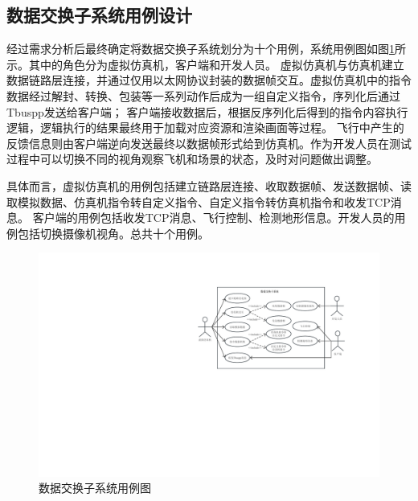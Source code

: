 \subsection{数据交换子系统用例设计}{
经过需求分析后最终确定将数据交换子系统划分为十个用例，系统用例图如图\ref{usecase}所示。其中的角色分为虚拟仿真机，客户端和开发人员。
虚拟仿真机与仿真机建立数据链路层连接，并通过仅用以太网协议封装的数据帧交互。虚拟仿真机中的指令数据经过解封、转换、包装等一系列动作后成为一组自定义指令，序列化后通过Tbuspp发送给客户端；
客户端接收数据后，根据反序列化后得到的指令内容执行逻辑，逻辑执行的结果最终用于加载对应资源和渲染画面等过程。
飞行中产生的反馈信息则由客户端逆向发送最终以数据帧形式给到仿真机。作为开发人员在测试过程中可以切换不同的视角观察飞机和场景的状态，及时对问题做出调整。
\par
具体而言，虚拟仿真机的用例包括建立链路层连接、收取数据帧、发送数据帧、读取模拟数据、仿真机指令转自定义指令、自定义指令转仿真机指令和收发TCP消息。
客户端的用例包括收发TCP消息、飞行控制、检测地形信息。开发人员的用例包括切换摄像机视角。总共十个用例。

\begin{figure}[h!]
    \begin{center}
        \includegraphics[width=\textwidth]{pictures/usecase.pdf}
        \caption{数据交换子系统用例图}
        \label{usecase}
    \end{center}
\end{figure}

}
